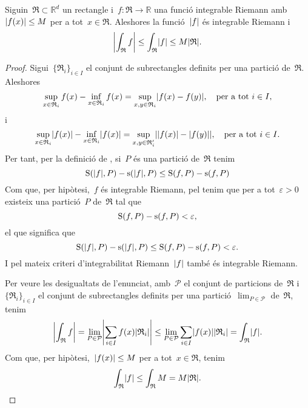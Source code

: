 \documentclass[../../main.tex]{subfiles}
\begin{document}
    \begin{theorem}
        \label{thm:la norma d'una integral és menys que l'integral de la norma}
        Siguin~\(\mathfrak{R}\subset\mathbb{R}^{d}\) un rectangle i~\(f\colon\mathfrak{R}\to\mathbb{R}\) una funció integrable Riemann amb~\(\abs{f(x)}\leq M\) per a tot~\(x\in \mathfrak{R}\).
        Aleshores la funció~\(\abs{f}\) és integrable Riemann i
        \[
            \abs{\int_{\mathfrak{R}}f}\leq\int_{\mathfrak{R}}\abs{f}\leq M\abs{\mathfrak{R}}.
        \]
        \begin{proof}
            Sigui~\(\{\mathfrak{R}_{i}\}_{i\in I}\) el conjunt de subrectangles definits per una partició de~\(\mathfrak{R}\).
            Aleshores
            \[
                \sup_{x\in \mathfrak{R}_{i}}f(x)-\inf_{x\in \mathfrak{R}_{i}}f(x)=\sup_{x,y\in \mathfrak{R}_{i}}\abs{f(x)-f(y)},\quad\text{per a tot }i\in I,
            \]
            i
            \[
                \sup_{x\in \mathfrak{R}_{i}}\abs{f(x)}-\inf_{x\in \mathfrak{R}_{i}}\abs{f(x)}=\sup_{x,y\in \mathfrak{R}'_{i}}\abs{\abs{f(x)}-\abs{f(y)}},\quad\text{per a tot }i\in I.
            \]
            Per tant, per la definició de , si~\(P\) és una partició de~\(\mathfrak{R}\) tenim
            \[
                \Ssup(\abs{f},P)-\sinf(\abs{f},P)\leq\Ssup(f,P)-\sinf(f,P)
            \]
            Com que, per hipòtesi,~\(f\) és integrable Riemann, pel  tenim que per a tot~\(\varepsilon>0\) existeix una partició~\(P\) de~\(\mathfrak{R}\) tal que
            \[
                \operatorname{S}(f,P)-\operatorname{s}(f,P)<\varepsilon,
            \]
            el que significa que
            \[
                \Ssup(\abs{f},P)-\sinf(\abs{f},P)\leq\Ssup(f,P)-\sinf(f,P)<\varepsilon.
            \]
            I pel mateix criteri d'integrabilitat Riemann~\(\abs{f}\) també és integrable Riemann.

            Per veure les desigualtats de l'enunciat, amb~\(\mathcal{P}\) el conjunt de particions de~\(\mathfrak{R}\) i~\(\{\mathfrak{R}_{i}\}_{i\in I}\) el conjunt de subrectangles definits per una partició~\(\lim_{P\in\mathcal{P}}\) de~\(\mathfrak{R}\), tenim
            \[
                \abs{\int_{\mathfrak{R}}f}=\lim_{P\in\mathcal{P}}\abs{\sum_{i\in I}f(x)\abs{\mathfrak{R}_{i}}}\leq\lim_{P\in\mathcal{P}}\sum_{i\in I}\abs{f(x)}\abs{\mathfrak{R}_{i}}=\int_{\mathfrak{R}}\abs{f}.
            \]
            Com que, per hipòtesi,~\(\abs{f(x)}\leq M\) per a tot~\(x\in \mathfrak{R}\), tenim
            \[
                \int_{\mathfrak{R}}\abs{f}\leq\int_{\mathfrak{R}}M=M\abs{\mathfrak{R}}.\qedhere
            \]
        \end{proof}
    \end{theorem}
\end{document}
